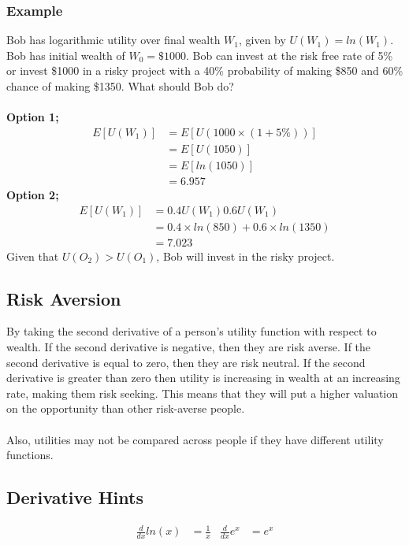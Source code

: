 \documentclass[a4paper]{article}
\begin{document}
\subsubsection{Example}
Bob has logarithmic utility over final wealth $W_1$, given by
$U(W_1) = ln(W_1)$. Bob has initial wealth of $W_0 = \$1000$. Bob can
invest at the risk free rate of 5\% or invest \$1000 in a risky project
with a 40\% probability of making \$850 and 60\% chance of making
\$1350. What should Bob do?\\\\
\textbf{Option 1;}
\begin{align*}
E[U(W_1)] &= E[U(1000 \times (1 + 5\%))]\\
 &= E[U(1050)] \\
 &= E[ln(1050)]\\
 &= 6.957
\end{align*}
\textbf{Option 2;}
\begin{align*}
E[U(W_1)] 
 &= 0.4 U(W_1) 0.6 U(W_1) \\
&= 0.4 \times ln(850) + 0.6 \times ln(1350) \\
&= 7.023
\end{align*}
Given that $U(O_2) > U(O_1)$, Bob will invest in the risky project.

\subsection{Risk Aversion}
By taking the second derivative of a person's utility function with respect to
wealth. If the second derivative is negative, then they are risk averse.
If the second derivative is equal to zero, then they are
risk neutral. If the second derivative is greater than zero then utility is
increasing in wealth at an increasing rate, making them risk seeking. This means that
they will
put a higher valuation on the opportunity than other risk-averse people.
\\\\
%
%
Also, utilities may not be compared across people if they have different utility
functions.
\subsection{Derivative Hints}
\begin{align*}
\frac{d}{dx} ln(x) &= \frac{1}{x} & \frac{d}{dx} e^x &= e^x
\end{align*}
%
%
%
\end{document}
